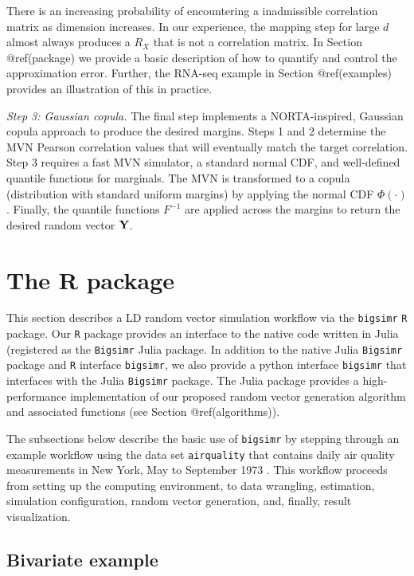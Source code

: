 \documentclass[
]{jss}
\begin{document}
There is an increasing probability of encountering a inadmissible
correlation matrix as dimension increases. In our experience, the
mapping step for large \(d\) almost always produces a \(R_X\) that is
not a correlation matrix. In Section @ref(package) we provide a basic
description of how to quantify and control the approximation error.
Further, the RNA-seq example in Section @ref(examples) provides an
illustration of this in practice.

\emph{Step 3: Gaussian copula.} The final step implements a
NORTA-inspired, Gaussian copula approach to produce the desired margins.
Steps 1 and 2 determine the MVN Pearson correlation values that will
eventually match the target correlation. Step 3 requires a fast MVN
simulator, a standard normal CDF, and well-defined quantile functions
for marginals. The MVN is transformed to a copula (distribution with
standard uniform margins) by applying the normal CDF \(\Phi(\cdot)\).
Finally, the quantile functions \(F^{-1}\) are applied across the
margins to return the desired random vector \({\bf Y}\).

\section[bigsimr-pkg]{The  R package}\label{package}

This section describes a LD random vector simulation workflow via the
\texttt{bigsimr} \texttt{R} package. Our \texttt{R} package provides an
interface to the native code written in Julia (registered as the
\texttt{Bigsimr} Julia package. In addition to the native Julia
\texttt{Bigsimr} package and \texttt{R} interface \texttt{bigsimr}, we
also provide a python interface \texttt{bigsimr} that interfaces with
the Julia \texttt{Bigsimr} package. The Julia package provides a
high-performance implementation of our proposed random vector generation
algorithm and associated functions (see Section @ref(algorithms)).

The subsections below describe the basic use of \texttt{bigsimr} by
stepping through an example workflow using the data set
\texttt{airquality} that contains daily air quality measurements in New
York, May to September 1973 \citep{Chambers1983}. This workflow proceeds
from setting up the computing environment, to data wrangling,
estimation, simulation configuration, random vector generation, and,
finally, result visualization.

\hypertarget{bivariate-example}{%
\subsection{Bivariate example}\label{bivariate-example}}
\end{document}

